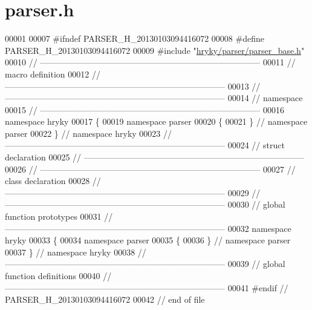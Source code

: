 \hypertarget{parser_8h_source}{\section{parser.\-h}
}

\begin{DoxyCode}
00001 
00007 \textcolor{preprocessor}{#ifndef PARSER\_H\_20130103094416072}
00008 \textcolor{preprocessor}{}\textcolor{preprocessor}{#define PARSER\_H\_20130103094416072}
00009 \textcolor{preprocessor}{}\textcolor{preprocessor}{#include "\hyperlink{parser__base_8h}{hryky/parser/parser_base.h}"}
00010 \textcolor{comment}{//
      ------------------------------------------------------------------------------}
00011 \textcolor{comment}{// macro definition}
00012 \textcolor{comment}{//
      ------------------------------------------------------------------------------}
00013 \textcolor{comment}{//
      ------------------------------------------------------------------------------}
00014 \textcolor{comment}{// namespace}
00015 \textcolor{comment}{//
      ------------------------------------------------------------------------------}
00016 \textcolor{keyword}{namespace }hryky
00017 \{
00019 \textcolor{keyword}{namespace }parser
00020 \{
00021 \} \textcolor{comment}{// namespace parser}
00022 \} \textcolor{comment}{// namespace hryky}
00023 \textcolor{comment}{//
      ------------------------------------------------------------------------------}
00024 \textcolor{comment}{// struct declaration}
00025 \textcolor{comment}{//
      ------------------------------------------------------------------------------}
00026 \textcolor{comment}{//
      ------------------------------------------------------------------------------}
00027 \textcolor{comment}{// class declaration}
00028 \textcolor{comment}{//
      ------------------------------------------------------------------------------}
00029 \textcolor{comment}{//
      ------------------------------------------------------------------------------}
00030 \textcolor{comment}{// global function prototypes}
00031 \textcolor{comment}{//
      ------------------------------------------------------------------------------}
00032 \textcolor{keyword}{namespace }hryky
00033 \{
00034 \textcolor{keyword}{namespace }parser
00035 \{
00036 \} \textcolor{comment}{// namespace parser}
00037 \} \textcolor{comment}{// namespace hryky}
00038 \textcolor{comment}{//
      ------------------------------------------------------------------------------}
00039 \textcolor{comment}{// global function definitions}
00040 \textcolor{comment}{//
      ------------------------------------------------------------------------------}
00041 \textcolor{preprocessor}{#endif // PARSER\_H\_20130103094416072}
00042 \textcolor{preprocessor}{}\textcolor{comment}{// end of file}
\end{DoxyCode}
